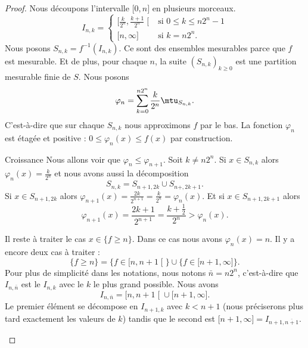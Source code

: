 \begin{proof}
    Nous découpons l'intervalle \( \mathopen[ 0 , n \mathclose]\) en plusieurs morceaux.
    \begin{equation}
        I_{n,k}=\begin{cases}
            \mathopen[ \frac{ k }{ 2^n } , \frac{ k+1 }{ 2^n } \mathclose[  & \text{si } 0\leq k\leq n2^n-1   \\
            \mathopen[ n , \infty \mathclose]                               & \text{si } k=n2^n.
        \end{cases}
    \end{equation}
    Nous posons \( S_{n,k}=f^{-1}(I_{n,k})\). Ce sont des ensembles mesurables parce que \( f\) est mesurable. Et de plus, pour chaque \( n\), la suite \( (S_{n,k})_{k\geq 0}\) est une partition mesurable finie de \( S\). Nous posons
    \begin{equation}
        \varphi_n=\sum_{k=0}^{n2^n}\frac{ k }{ 2^n }\mtu_{S_{n,k}}.
    \end{equation}
    C'est-à-dire que sur chaque \( S_{n,k}\) nous approximons \( f\) par le bas. La fonction \( \varphi_n\) est étagée et positive : \( 0\leq \varphi_n(x)\leq f(x)\) par construction.
    \begin{subproof}
    \item[Croissance]
        Nous allons voir que \( \varphi_n\leq \varphi_{n+1}\). Soit \( k\neq n2^n\). Si \( x\in S_{n,k}\) alors \( \varphi_n(x)=\frac{ k }{ 2^n }\) et nous avons aussi la décomposition
        \begin{equation}
            S_{n,k}=S_{n+1,2k}\cup S_{n+,2k+1}.
        \end{equation}
        Si \( x\in S_{n+1,2k}\) alors \( \varphi_{n+1}(x)=\frac{ 2k }{ 2^{n+1} }=\frac{ k }{ 2^n }=\varphi_n(x)\). Et si \( x\in S_{n+1,2k+1}\) alors
        \begin{equation}
            \varphi_{n+1}(x)=\frac{ 2k+1 }{ 2^{n+1} }=\frac{ k+\frac{ 1 }{2} }{ 2^n }>\varphi_n(x).
        \end{equation}

        Il reste à traiter le cas \( x\in\{ f\geq n \}\). Dans ce cas nous avons \( \varphi_n(x)=n\). Il y a encore deux cas à traiter :
        \begin{equation}
            \{ f\geq n \}=\{ f\in\mathopen[ n , n+1 \mathclose[ \}\cup\{ f\in\mathopen[ n+1 , \infty \mathclose] \}.
        \end{equation}
        Pour plus de simplicité dans les notations, nous notons \( \bar n=n2^n\), c'est-à-dire que \( I_{n,\bar n}\) est le \( I_{n,k}\) avec le \( k\) le plus grand possible. Nous avons
        \begin{equation}
            I_{n,\bar n}=\mathopen[ n , n+1 \mathclose[\cup\mathopen[ n+1 , \infty \mathclose].
        \end{equation}
        Le premier élément se décompose en \( I_{n+1,k}\) avec \( k<n+1\) (nous préciserons plus tard exactement les valeurs de \( k\)) tandis que le second est \( \mathopen[ n+1 , \infty \mathclose]=I_{n+1,\overline{ n+1 }}\).


\end{subproof}
\end{proof}

